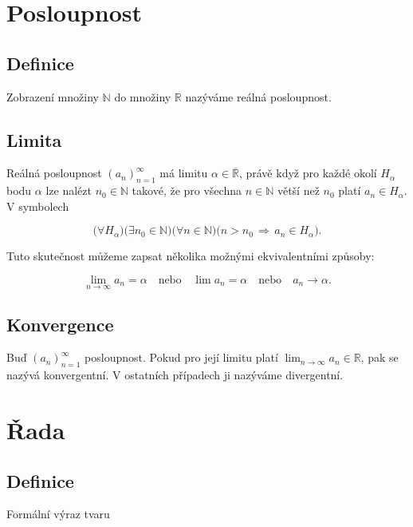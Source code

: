 \documentclass{szzclass}
\author{Daniel Hampl}
\begin{document}

\tableofcontents
\newpage


\section{Posloupnost}
\subsection{Definice}
Zobrazení množiny $\mathbb{N}$ do množiny $\mathbb{R}$ nazýváme reálná posloupnost.

\subsection{Limita}
Reálná posloupnost $(a_n)_{n=1}^\infty$ má limitu $\alpha\in\overline{\mathbb{R}}$,
právě když pro každé okolí $H_\alpha$ bodu $\alpha$ lze nalézt $n_0\in\mathbb{N}$ takové,
že pro všechna $n\in\mathbb{N}$ větší než $n_0$ platí $a_n\in H_\alpha$. V symbolech

\begin{equation*}
\big({\forall H_\alpha} \big) \big({\exists n_0\in\mathbb{N}} \big) \big({\forall n \in \mathbb{N}} \big) \big({n>n_0 \, \Rightarrow \, a_n \in H_\alpha} \big).\end{equation*}

Tuto skutečnost můžeme zapsat několika možnými ekvivalentními způsoby:

\begin{equation*}
\lim_{n\to\infty} a_n = \alpha \quad \text{nebo} \quad \lim a_n = \alpha \quad \text{nebo} \quad a_n \to \alpha.\end{equation*}

\subsection{Konvergence}
Buď $(a_n)_{n=1}^\infty$ posloupnost. Pokud pro její limitu platí
$\displaystyle\lim_{n\to\infty} a_n \in\mathbb{R}$,
pak se nazývá konvergentní. V ostatních případech ji nazýváme divergentní.

\section{Řada}
\subsection{Definice}
Formální výraz tvaru
\end{document}
